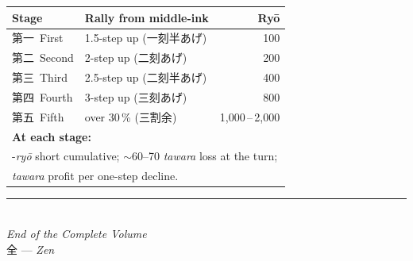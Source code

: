 \documentclass[10pt, openany]{book}
\newcommand{\jp}[1]{{\japanesefont #1}}
\begin{document}
\begin{center}
\begin{tabular}{@{}l l r@{}}
\toprule
\textbf{Stage} & \textbf{Rally from middle-ink} & \textbf{Ry\=o}\\
\midrule
\jp{第一}\ First   & 1.5-step up   (\jp{一刻半あげ})   & 100\\
\jp{第二}\ Second  & 2-step up     (\jp{二刻あげ})     & 200\\
\jp{第三}\ Third   & 2.5-step up   (\jp{二刻半あげ})   & 400\\
\jp{第四}\ Fourth  & 3-step up     (\jp{三刻あげ})     & 800\\
\jp{第五}\ Fifth   & over 30\,\%   (\jp{三割余})        & 1{,}000\,--\,2{,}000\\
\midrule
\multicolumn{3}{l}{\textbf{At each stage:}}\\
\multicolumn{3}{l}{\quad 800-\textit{ry\=o} short cumulative; ${\sim}$60--70 \textit{tawara} loss at the turn;}\\
\multicolumn{3}{l}{\quad 160 \textit{tawara} profit per one-step decline.}\\
\bottomrule
\end{tabular}
\end{center}

\vfill

\begin{center}
\rule{2in}{0.4pt}\\[1em]
{\small\itshape End of the Complete Volume}\\[0.3em]
{\small \jp{全} --- \textit{Zen}}
\end{center}
\end{document}
